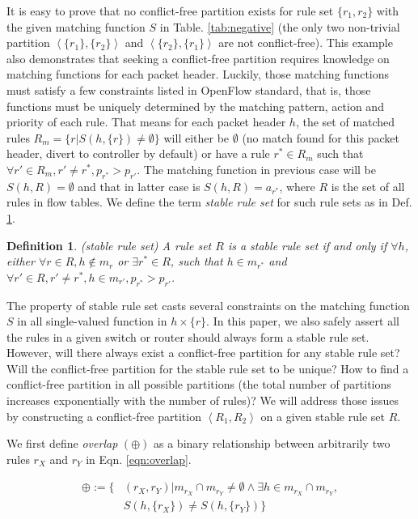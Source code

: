 \documentclass[10pt,twocolumn,letterpaper]{article}
\newtheorem{definition}{Definition}
\begin{document}
It is easy to prove that no conflict-free partition exists for rule set $\{r_1,r_2\}$ with the given matching function $S$ in Table. \ref{tab:negative} (the only two non-trivial partition $\left< \{r_1\}, \{r_2\} \right>$ and $\left< \{r_2\}, \{r_1\} \right>$ are not conflict-free). This example also demonstrates that seeking a conflict-free partition requires knowledge on matching functions for each packet header. Luckily, those matching functions must satisfy a few constraints listed in OpenFlow standard\cite{mckeown2008openflow}, that is, those functions must be uniquely determined by the matching pattern, action and priority of each rule. That means for each packet header $h$, the set of matched rules $R_m = \{r| S(h,\{r\})\neq \emptyset\}$ will either be $\emptyset$ (no match found for this packet header, divert to controller by default) or have a rule $r^* \in R_m$ such that $\forall r' \in R_m, r' \neq r^*, p_{r^*}>p_{r'}$. The matching function in previous case will be $S(h,R)=\emptyset$ and that in latter case is $S(h,R)=a_{r^*}$, where $R$ is the set of all rules in flow tables. We define the term \textit{stable rule set} for such rule sets as in Def. \ref{def:stable_rule_set}.

\begin{definition}
\emph{(stable rule set)}
\label{def:stable_rule_set}
A rule set $R$ is a stable rule set if and only if $\forall h$, either $\forall r \in R, h\not\in m_r$ or $\exists r^* \in R$, such that $h \in m_{r^*}$ and $\forall r' \in R, r'\neq r^*, h\in m_{r'}, p_{r^*}>p_{r'}$. 
\end{definition}

The property of stable rule set casts several constraints on the matching function $S$ in all single-valued function in $h \times \{r\}$. In this paper, we also safely assert all the rules in a given switch or router should always form a stable rule set. However, will there always exist a conflict-free partition for any stable rule set? Will the conflict-free partition for the stable rule set to be unique? How to find a conflict-free partition in all possible partitions (the total number of partitions increases exponentially with the number of rules)? We will address those issues by constructing a conflict-free partition $\left< R_1, R_2 \right>$ on a given stable rule set $R$.

We first define \textit{overlap} $(\oplus)$ as a binary relationship between arbitrarily two rules $r_X$ and $r_Y$ in Eqn. \ref{eqn:overlap}. 

\begin{equation}
\begin{split}
	\oplus := \{&(r_X,r_Y) | m_{r_X} \cap m_{r_Y} \neq \emptyset  \land \exists h \in m_{r_X} \cap m_{r_Y},\\ & S(h,\{r_X\}) \neq S(h,\{r_Y\})\}\label{eqn:overlap} 
\end{split}
\end{equation}
\end{document}
